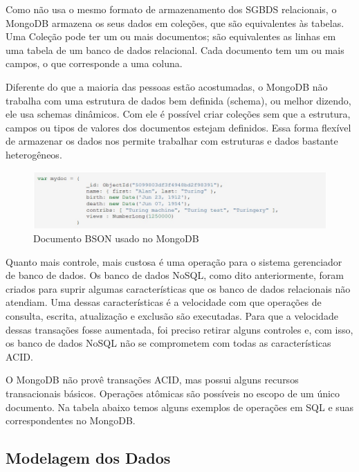 Como não usa o mesmo formato de armazenamento dos SGBDS relacionais, o MongoDB armazena os seus dados em coleções, que são equivalentes às tabelas.  Uma Coleção pode ter um ou mais documentos; são equivalentes as linhas em uma tabela de um banco de dados relacional. Cada documento tem um ou mais campos, o que corresponde a uma coluna.

Diferente do que a maioria das pessoas estão acostumadas, o MongoDB não trabalha com uma estrutura de dados bem definida (schema), ou melhor dizendo, ele usa schemas dinâmicos. Com ele é possível criar coleções sem que a estrutura, campos ou tipos de valores dos documentos estejam definidos. Essa forma flexível de armazenar os dados nos permite trabalhar com estruturas e dados bastante heterogêneos.

	\begin{figure}[!htbp]
		\begin{center}
			\includegraphics[width=1.2\textwidth]{exbson}
		\end{center}
		\caption{Documento BSON usado no MongoDB ~\cite{sitemongodb}}
		\label{fig:exbson}
	\end{figure}

Quanto mais controle, mais custosa é uma operação para o sistema gerenciador de banco de dados.  Os banco de dados NoSQL, como dito anteriormente, foram criados para suprir algumas características que os banco de dados relacionais não atendiam. Uma dessas características é a velocidade com que operações de consulta, escrita, atualização e exclusão são executadas.  Para que a velocidade dessas transações fosse aumentada, foi preciso retirar alguns controles e, com isso, os banco de dados NoSQL não se comprometem com todas as características ACID.

O MongoDB não provê transações ACID, mas possui alguns recursos transacionais básicos. Operações atômicas são possíveis no escopo de um único documento. Na tabela abaixo temos alguns exemplos de operações em SQL e suas correspondentes no MongoDB.

\subsection{Modelagem dos Dados}

